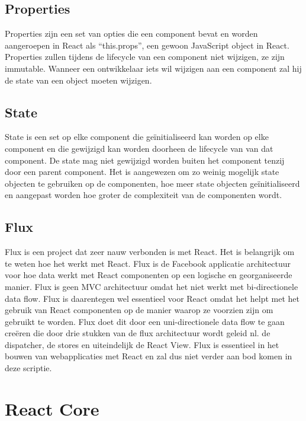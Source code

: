 	
	\subsection{Properties}
		
		Properties zijn een set van opties die een component bevat en worden aangeroepen in React als ``this.props'', een gewoon JavaScript object in React. Properties zullen tijdens de lifecycle van een component niet wijzigen, ze zijn immutable. Wanneer een ontwikkelaar iets wil wijzigen aan een component zal hij de state van een object moeten wijzigen.
	
	\subsection{State}
		
		State is een set op elke component die geïnitialiseerd kan worden op elke component en die gewijzigd kan worden doorheen de lifecycle van van dat component. De state mag niet gewijzigd worden buiten het component tenzij door een parent component. Het is aangewezen om zo weinig mogelijk state objecten te gebruiken op de componenten, hoe meer state objecten geïnitialiseerd en aangepast worden hoe groter de complexiteit van de componenten wordt.
	
	\subsection{Flux}
		
		Flux is een project dat zeer nauw verbonden is met React. Het is belangrijk om te weten hoe het werkt met React. Flux is de Facebook applicatie architectuur voor hoe data werkt met React componenten op een logische en georganiseerde manier. Flux is geen MVC architectuur omdat het niet werkt met bi-directionele data flow. Flux is daarentegen wel essentieel voor React omdat het helpt met het gebruik van React componenten op de manier waarop ze voorzien zijn om gebruikt te worden. Flux doet dit door een uni-directionele data flow te gaan creëren die door drie stukken van de flux architectuur wordt geleid nl. de dispatcher, de stores en uiteindelijk de React View. Flux is essentieel in het bouwen van webapplicaties met React en zal dus niet verder aan bod komen in deze scriptie.

\section{React Core}
	
